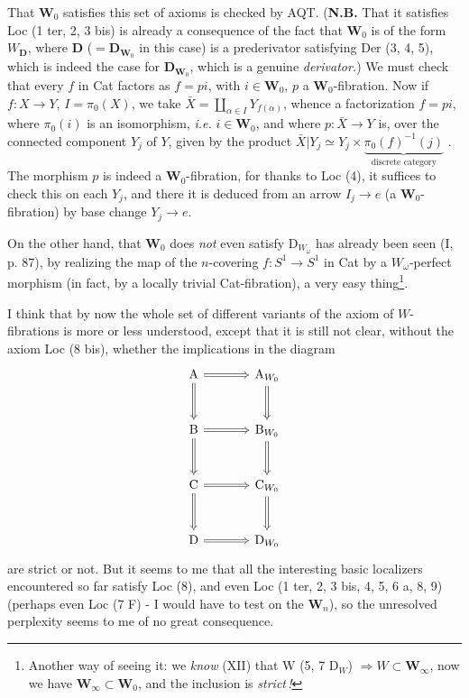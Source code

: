 
That $\mathbf{W}_0$ satisfies this set of axioms is checked by AQT. (\textbf{N.B.} That it satisfies Loc (1 ter, 2, 3 bis) is already a consequence of the fact that $\mathbf{W}_0$ is of the form $W_{\mathbf{D}}$, where $\mathbf{D}$ ($=\mathbf{D}_{\mathbf{W}_0}$ in this case) is a prederivator satisfying Der (3, 4, 5), which is indeed the case for $\mathbf{D}_{\mathbf{W}_0}$, which is a genuine \textit{derivator.}) We must check that every $f$ in Cat factors as $f = pi$, with $i \in \mathbf{W}_0$, $p$ a $\mathbf{W}_0$-fibration. Now if $f : X \longrightarrow Y$, $I = \pi_0(X)$, we take $\bar{X} = \coprod_{\alpha\in I} Y_{f(\alpha)}$, whence a factorization $f = pi$, where $\pi_0(i)$ is an isomorphism, \textit{i.e.} $i \in \mathbf{W}_0$, and where $p : \bar{X} \longrightarrow Y$ is, over the connected component $Y_j$ of $Y$, given by the product $\bar{X}|Y_j \simeq Y_j \times \underbrace{\pi_0(f)^{-1}(j)}_{\text{discrete category}}$ . The morphism $p$ is indeed a $\mathbf{W}_0$-fibration, for thanks to Loc (4), it suffices to check this on each $Y_j$, and there it is deduced from an arrow $I_j \longrightarrow e$ (a $\mathbf{W}_0$-fibration) by base change $Y_j \longrightarrow e$.

On the other hand, that $\mathbf{W}_0$ does \textit{not} even satisfy $\mathrm{D}_{W_\omega}$ has already been seen (I, p. 87),
by realizing the map of the $n$-covering $f : S^1 \longrightarrow S^1$ in Cat by a $W_\omega$-perfect morphism (in fact, by a locally trivial Cat-fibration), a very easy thing\footnote[37]{Another way of seeing it: we \textit{know} (XII) that $\mathrm{W}$ (5, 7 $\mathrm{D}_W$) $\Longrightarrow W \subset \mathbf{W}_\infty$, now we have $\mathbf{W}_\infty \subset \mathbf{W}_0$, and the inclusion is \textit{strict\,!}}.

I think that by now the whole set of different variants of the axiom of $W$-fibrations is more or less understood, except that it is still not clear, without the axiom Loc (8 bis), whether the implications in the diagram
\[
\begin{tikzcd}[row sep=large, column sep=large]
\mathrm{A} \arrow[r, Rightarrow] \arrow[d, Rightarrow] & \mathrm{A}_{W_0} \arrow[d, Rightarrow] \\
\mathrm{B} \arrow[r, Rightarrow] \arrow[d, Rightarrow] & \mathrm{B}_{W_0} \arrow[d, Rightarrow] \\
\mathrm{C} \arrow[r, Rightarrow] \arrow[d, Rightarrow] & \mathrm{C}_{W_0} \arrow[d, Rightarrow] \\
\mathrm{D} \arrow[r, Rightarrow] & \mathrm{D}_{W_0}
\end{tikzcd}
\]
are strict or not. But it seems to me that all the interesting basic localizers encountered so far satisfy Loc (8), and even Loc (1 ter, 2, 3 bis, 4, 5, 6 a, 8, 9) (perhaps even Loc (7 F) - I would have to test on the $\mathbf{W}_n$), so the unresolved perplexity seems to me of no great consequence. %

